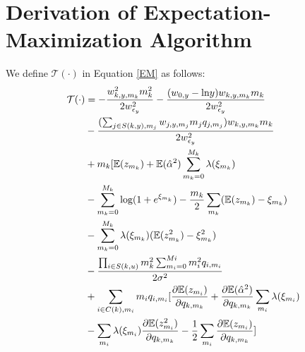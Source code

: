 \documentclass[review]{elsarticle}
\begin{document}
\section{Derivation of Expectation-Maximization Algorithm}\label{appendix_EM}
We define $\mathcal{T}(\cdot)$ in Equation \ref{EM} as follows: 
\begin{equation*}
\begin{aligned}
    \mathcal{T}(\cdot) & = - \frac{w_{k,y,m_{k}}^{2}m_{k}^{2}}{2w_{\epsilon_{y}}^{2}} - \frac{(w_{0,y} - \text{ln}y)w_{k,y,m_{k}}m_{k}}{2w_{\epsilon_{y}}^{2}}  \\
    & - \frac{(\sum_{j \in S(k,y), m_{j}}w_{j,y, m_{j}}m_{j}q_{j, m_{j}})w_{k,y,m_{k}}m_{k}}{2w_{\epsilon_{y}}^{2}} \\
    & + m_{k}[ \mathbb{E}(z_{m_{k}}) + \mathbb{E}(\hat{\alpha}^{2})\sum_{m_{k} = 0}^{M_{k}}\lambda(\xi_{m_{k}}) \\
    & -\sum_{m_{k} = 0}^{M_{k}}\text{log}(1+e^{\xi_{m_{k}}}) 
     - \frac{m_{k}}{2}\sum_{m_{k}}(\mathbb{E}(z_{m_{k}}) - \xi_{m_{k}})\\
    &  - \sum_{m_{k} = 0}^{M_{k}}\lambda(\xi_{m_{k}})(\mathbb{E}(z_{m_{k}}^{2})-\xi_{m_{k}}^{2}) \\
    & - \frac{\prod_{i \in S(k,u)}m_{k}^{2}\sum_{m_{i} = 0}^{M_{\scriptscriptstyle} i}m_{i}^{2}q_{i, m_{i}}}{2\sigma^{2}}\\
    & + \sum_{i \in C(k), m_{i}}m_{i}q_{i, m_{i}}[\frac{\partial \mathbb{E}(z_{m_{i}})}{\partial q_{k, m_{k}}} + \frac{\partial \mathbb{E}(\hat{\alpha}^{2})}{\partial q_{k, m_{k}}}\sum_{m_{i}}\lambda(\xi_{m_{i}}) \\
    & - \sum_{m_{i}}\lambda(\xi_{m_{i}})\frac{\partial \mathbb{E}(z_{m_{i}}^{2})}{\partial q_{k, m_{k}}} - \frac{1}{2}\sum_{m_{i}}\frac{\partial \mathbb{E}(z_{m_{i}})}{\partial q_{k, m_{k}}}]
\end{aligned}
\end{equation*}
\end{document}
